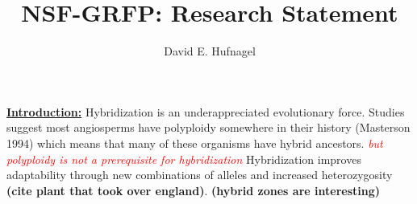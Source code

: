 \documentclass[12pt]{amsart}
\title{NSF-GRFP: Research Statement}
\author{David E. Hufnagel}
\newcommand{\mbh}[1]{\textcolor{red}{ \emph{\scriptsize  #1}} }
\begin{document}
\maketitle

\textbf{\underline{Introduction:} }
Hybridization is an underappreciated evolutionary force.
Studies suggest most angiosperms have polyploidy somewhere in their history (Masterson 1994) which means that many of these organisms have hybrid ancestors. \mbh{but polyploidy is not a prerequisite for hybridization}
Hybridization improves adaptability through new combinations of alleles and increased heterozygosity \textbf{(cite plant that took over england)}. \textbf{(hybrid zones are interesting)}
\end{document}
